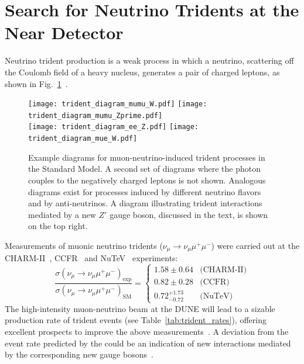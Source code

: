 \section{Search for Neutrino Tridents at the Near Detector}
Neutrino trident production is a weak process in which a neutrino, scattering off the Coulomb field of a heavy nucleus, generates a pair of charged leptons, as shown in Fig.~\ref{fig:diagrams}~\cite{Czyz:1964zz,Lovseth:1971vv,Fujikawa:1971nx,Koike:1971tu,Koike:1971vg,Brown:1973ih,Belusevic:1987cw}.
\begin{figure}[!hb]
\centering
\texttt{[image: trident\_diagram\_mumu\_W.pdf]} \qquad
\texttt{[image: trident\_diagram\_mumu\_Zprime.pdf]} \\[\baselineskip]
\texttt{[image: trident\_diagram\_ee\_Z.pdf]} \qquad
\texttt{[image: trident\_diagram\_mue\_W.pdf]} \\[\baselineskip]
\caption[Example diagrams for $\numu$-induced trident processes in the SM]{Example diagrams for muon-neutrino-induced trident processes in the Standard Model. A second set of diagrams where the photon couples to the negatively charged leptons is not shown. 
Analogous diagrams exist for processes induced by different neutrino flavors and by anti-neutrinos. A diagram illustrating trident interactions mediated by a new $Z'$ gauge boson, discussed in the text, is shown on the top right.}
\label{fig:diagrams}
\end{figure}
Measurements of muonic neutrino tridents ($\nu_\mu \to \nu_\mu \mu^+\mu^-$) were carried out at the CHARM-II~\cite{Geiregat:1990gz}, CCFR~\cite{Mishra:1991bv} and NuTeV~\cite{Adams:1999mn} experiments:
\[
\frac{\sigma(\nu_\mu \to \nu_\mu \mu^+\mu^-)_\text{exp}}{\sigma(\nu_\mu \to \nu_\mu \mu^+\mu^-)_\text{SM}} = 
\begin{cases}
1.58 \pm 0.64         & \text{(CHARM-II)} \\ 
0.82 \pm 0.28         & \text{(CCFR)} \\
0.72 ^{+1.73}_{-0.72} & \text{(NuTeV)} 
\end{cases}
\]
The high-intensity muon-neutrino beam at the DUNE   will lead to a sizable production rate of trident events (see Table~\ref{tab:trident_rates}), offering excellent prospects to improve the above measurements~\cite{Altmannshofer:2019zhy,Ballett:2018uuc,Ballett:2019xoj}. A deviation from the event rate predicted by the  could be an indication of new interactions mediated by the corresponding new gauge bosons~\cite{Altmannshofer:2014pba}. 

